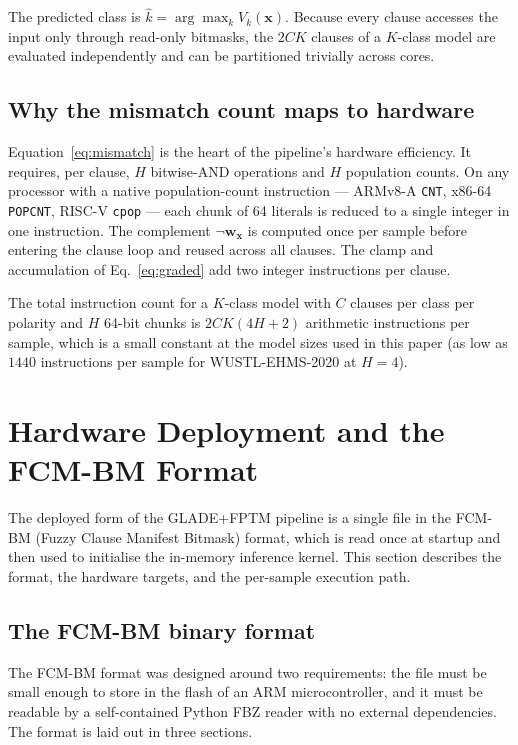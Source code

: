 \documentclass[journal,10pt]{IEEEtran}
\begin{document}
The predicted class is $\hat{k} = \arg\max_k V_k(\mathbf{x})$.
Because every clause accesses the input only through read-only
bitmasks, the $2CK$ clauses of a $K$-class model are evaluated
independently and can be partitioned trivially across cores.

\subsection{Why the mismatch count maps to hardware}
\label{sec:fptm-hw}

Equation~\eqref{eq:mismatch} is the heart of the pipeline's hardware
efficiency. It requires, per clause, $H$ bitwise-AND operations and
$H$ population counts. On any processor with a native population-count
instruction --- ARMv8-A \texttt{CNT}, x86-64 \texttt{POPCNT},
RISC-V \texttt{cpop} --- each chunk of 64 literals is reduced to a
single integer in one instruction. The complement $\neg\mathbf{w}_\mathbf{x}$
is computed once per sample before entering the clause loop and reused
across all clauses. The clamp and accumulation
of Eq.~\eqref{eq:graded} add two integer instructions per clause.

The total instruction count for a $K$-class model with $C$ clauses
per class per polarity and $H$ 64-bit chunks is
$2CK(4H + 2)$ arithmetic instructions per sample, which is a small
constant at the model sizes used in this paper (as low as $1440$
instructions per sample for WUSTL-EHMS-2020 at $H=4$).

\section{Hardware Deployment and the FCM-BM Format}
\label{sec:hardware}

The deployed form of the GLADE+FPTM pipeline is a single file in the
FCM-BM (Fuzzy Clause Manifest Bitmask) format, which is read once
at startup and then used to initialise the in-memory inference kernel.
This section describes the format, the hardware targets, and the
per-sample execution path.

\subsection{The FCM-BM binary format}
\label{sec:hw-fcmbm}

The FCM-BM format was designed around two requirements: the file must
be small enough to store in the flash of an ARM microcontroller, and
it must be readable by a self-contained Python FBZ reader with no external
dependencies. The format is laid out in three sections.
\end{document}
